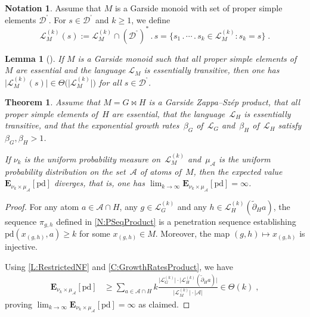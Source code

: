 \documentclass[a4paper,final]{article}
\let\ge\geqslant
\let\zs=\bowtie
\theoremstyle{plain}
\newtheorem{theorem}{Theorem}
\newtheorem{lemma}[lemma]{Lemma}
\theoremstyle{remark}
\theoremstyle{definition}
\newtheorem{notation}[notation]{Notation}
\begin{document}
\begin{notation}
Assume that $M$ is a Garside monoid with set of proper simple elements ${{\mathcal{D}}^{\!{}^{\circ}\!}}$.
For $s\in {{\mathcal{D}}^{\!{}^{\circ}\!}}$ and $k\ge 1$, we define
\[
  {\mathcal{L}}_M^{(k)}(s) := {\mathcal{L}}_M^{(k)} \cap ({{\mathcal{D}}^{\!{}^{\circ}\!}})^*{\mathbin{.}} s
    = \{ s_1{\mathbin{.}}\cdots{\mathbin{.}} s_k\in {\mathcal{L}}_M^{(k)} : s_k = s \}
  \;.
\]
\end{notation}

\begin{lemma}[{\cite[Lemma~4.10]{GT13}}]\label{L:RestrictedNF}
If $M$ is a Garside monoid such that all proper simple elements of $M$ are essential and the language ${\mathcal{L}}_M$ is essentially transitive, then one has
$\big|{\mathcal{L}}_M^{(k)}(s)\big| \in \Theta\Big(\big|{\mathcal{L}}_M^{(k)}\big|\Big)$ for all $s\in{{\mathcal{D}}^{\!{}^{\circ}\!}}$.
\end{lemma}

\begin{theorem}\label{T:PSeqProduct}
Assume that $M=G\zs H$ is a Garside {Zappa--Sz{\'e}p}{} product, that all proper simple elements of~$H$ are essential, that the language~${\mathcal{L}}_H$ is essentially transitive, and that the exponential growth rates~$\beta_G$ of~${\mathcal{L}}_G$  and~$\beta_H$ of~${\mathcal{L}}_H$ satisfy $\beta_G,\beta_H>1$.

If $\nu_{k}$ is the uniform probability measure on~${\mathcal{L}}_M^{(k)}$ and~$\mu_{\mathcal{A}}$ is the uniform probability distribution on the set~${\mathcal{A}}$ of atoms of~$M$, then the expected value
$\mathbf{E}_{\nu_{k} \times \mu_{\mathcal{A}}}[{\mathrm{pd}}]$ diverges, that is, one has $\lim_{k\to\infty} \mathbf{E}_{\nu_{k} \times \mu_{\mathcal{A}}}[{\mathrm{pd}}] = \infty$.
\end{theorem}
\begin{proof}
For any atom $a\in{\mathcal{A}}\cap H$, any $g\in{\mathcal{L}}_G^{(k)}$ and any $h\in{\mathcal{L}}_H^{(k)}({\widetilde{\partial}}_H a)$, 
the sequence $\pi_{g,h}$ defined in \autoref{N:PSeqProduct} is a penetration sequence establishing ${\mathrm{pd}}(x_{(g,h)},a)\ge k$ for some $x_{(g,h)}\in M$.  Moreover, the map $(g,h)\mapsto x_{(g,h)}$ is injective.

Using \autoref{L:RestrictedNF} and \autoref{C:GrowthRatesProduct}, we have
\begin{align*}
 \mathbf{E}_{\nu_{k} \times \mu_{\mathcal{A}}}[{\mathrm{pd}}]
   & \ge \sum_{a\in{\mathcal{A}}\cap H} k
                 \frac{\big|{\mathcal{L}}_G^{(k)}\big|\cdot \big|{\mathcal{L}}_H^{(k)}({\widetilde{\partial}}_H a)\big|}
                      {\big|{\mathcal{L}}_M^{(k)}\big|\cdot \big|{\mathcal{A}}\big|}
     \in \Theta(k)
   \;,
\end{align*}
proving $\lim_{k\to\infty}\mathbf{E}_{\nu_{k} \times \mu_{\mathcal{A}}}[{\mathrm{pd}}] = \infty$ as claimed.
\end{proof}
\end{document}
